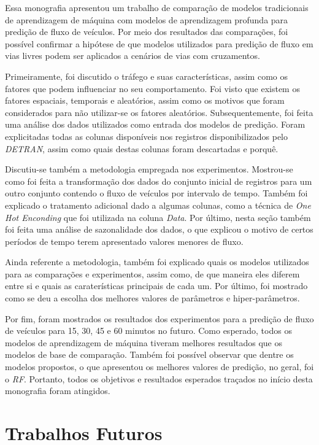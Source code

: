 Essa monografia apresentou um trabalho de comparação de modelos tradicionais de aprendizagem de máquina com modelos de aprendizagem profunda para predição de fluxo de veículos. Por meio dos resultados das comparações, foi possível confirmar a hipótese de que modelos utilizados para predição de fluxo em vias livres podem ser aplicados a cenários de vias com cruzamentos.

Primeiramente, foi discutido o tráfego e suas características, assim como os fatores que podem influenciar no seu comportamento. Foi visto que existem os fatores espaciais, temporais e aleatórios, assim como os motivos que foram considerados para não utilizar-se os fatores aleatórios. Subsequentemente, foi feita uma análise dos dados utilizados como entrada dos modelos de predição. Foram explicitadas todas as colunas disponíveis nos registros disponibilizados pelo \textit{\acrshort{DETRAN}}, assim como quais destas colunas foram descartadas e porquê. 

Discutiu-se também a metodologia empregada nos experimentos. Mostrou-se como foi feita a transformação dos dados do conjunto inicial de registros para um outro conjunto contendo o fluxo de veículos por intervalo de tempo. Também foi explicado o tratamento adicional dado a algumas colunas, como a técnica de \textit{One Hot Enconding} que foi utilizada na coluna \textit{Data}. Por último, nesta seção também foi feita uma análise de sazonalidade dos dados, o que explicou o motivo de certos períodos de tempo terem apresentado valores menores de fluxo.

Ainda referente a metodologia, também foi explicado quais os modelos utilizados para as comparações e experimentos, assim como, de que maneira eles diferem entre si e quais as caraterísticas principais de cada um. Por último, foi mostrado como se deu a escolha dos melhores valores de parâmetros e hiper-parâmetros.

Por fim, foram mostrados os resultados dos experimentos para a predição de fluxo de veículos para 15, 30, 45 e 60 minutos no futuro. Como esperado, todos os modelos de aprendizagem de máquina tiveram melhores resultados que os modelos de base de comparação. Também foi possível observar que dentre os modelos propostos, o que apresentou os melhores valores de predição, no geral, foi o \textit{\acrshort{RF}}. Portanto, todos os objetivos e resultados esperados traçados no início desta monografia foram atingidos.


\section{Trabalhos Futuros}

